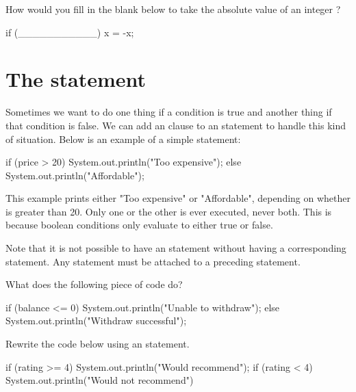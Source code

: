 \begin{example}
How would you fill in the blank below to take the absolute value of an integer ?

\begin{code}
if (___________) {
    x = -x;
} 
\end{code}
\end{example}

\section{The  statement}
Sometimes we want to do one thing if a condition is true and another thing if that condition is false. We can add an  clause to an  statement to handle this kind of situation. Below is an example of a simple  statement:

\begin{code}
if (price > 20) {
    System.out.println("Too expensive");
} else {
    System.out.println("Affordable");
}
\end{code}

This example prints either "Too expensive" or "Affordable", depending on whether  is greater than 20. Only one or the other is ever executed, never both. This is because boolean conditions only evaluate to either true or false.

Note that it is not possible to have an  statement without having a corresponding  statement. Any  statement must be attached to a preceding  statement. 

\begin{example}
What does the following piece of code do?

\begin{code}
if (balance <= 0) {
    System.out.println("Unable to withdraw");
} else {
    System.out.println("Withdraw successful");
}
\end{code}
\end{example}

\begin{example}
Rewrite the code below using an  statement.

\begin{code}
if (rating >= 4) {
    System.out.println("Would recommend");
} 
if (rating < 4) {
    System.out.println("Would not recommend")
}
\end{code}
\end{example}

